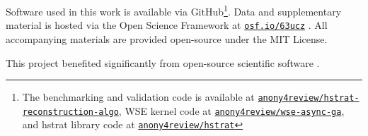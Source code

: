 Software used in this work is available via GitHub\footnote{The benchmarking and validation code is available at \href{https://github.com/anony4review/hstrat-reconstruction-algo}{\texttt{anony4review/hstrat-reconstruction-algo}}, WSE kernel code at \href{https://github.com/anony4review/wse-async-ga}{\texttt{anony4review/wse-async-ga}}, and hstrat library code at \href{https://github.com/anony4review/hstrat}{\texttt{anony4review/hstrat}}}.
Data and supplementary material is hosted via the Open Science Framework at \href{https://osf.io/63ucz/?view_only=2e3ec335c016436494ad125b14ffc8cb}{\texttt{osf.io/63ucz}} \citep{supplemental,foster2017open}.
All accompanying materials are provided open-source under the MIT License.

This project benefited significantly from open-source scientific software \citep{2020SciPy-NMeth,harris2020array,reback2020pandas,mckinney2010data,waskom2021seaborn,hunter2007matplotlib,moreno2023teeplot,moreno2024downstream}.